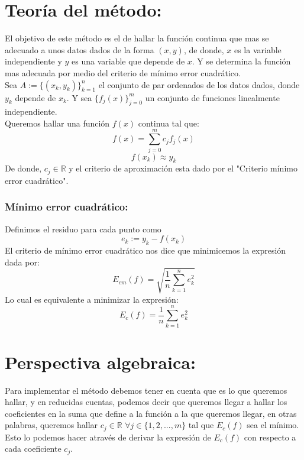 \section{Teoría del método:}
El objetivo de este método es el de hallar la función continua que mas se adecuado a unos datos dados de la forma $(x,y)$, de donde, $x$ es la variable independiente y $y$ es una variable que depende de $x$. Y se determina la función mas adecuada por medio del criterio de mínimo error cuadrático.\\

Sea $A:=\{(x_k,y_k)\}_{k=1}^n$ el conjunto de par ordenados de los datos dados, donde $y_k$ depende de $x_k$. Y sea $\{f_j(x)\}_{j=0}^m$ un conjunto de funciones linealmente independiente.\\

Queremos hallar una función $f(x)$ continua tal que:
$$f(x)=\sum_{j=0}^mc_jf_j(x)$$
$$f(x_k)\approx y_k$$
De donde, $c_j\in\mathbb{R}$ y el criterio de aproximación esta dado por el "Criterio mínimo error cuadrático".\\

\subsubsection{Mínimo error cuadrático:}
Definimos el residuo para cada punto como $$e_k:=y_k-f(x_k)$$
El criterio de mínimo error cuadrático nos dice que minimicemos la expresión dada por: $$E_{cm}(f)=\sqrt{\frac{1}{n}\sum_{k=1}^ne_k^2}$$
Lo cual es equivalente a minimizar la expresión:
$$E_c(f)=\frac{1}{n}\sum_{k=1}^ne_k^2$$
\section{Perspectiva algebraica:}
Para implementar el método debemos tener en cuenta que es lo que queremos hallar, y en reducidas cuentas, podemos decir que queremos llegar a hallar los coeficientes en la suma que define a la función a la que queremos llegar, en otras palabras, queremos hallar $c_j\in\mathbb{R}$ $\forall j\in\{1,2,...,m\}$ tal que $E_c(f)$ sea el mínimo. Esto lo podemos hacer através de derivar la expresión de $E_c(f)$ con respecto a cada coeficiente $c_j$.\\

